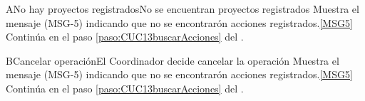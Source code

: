 	\begin{UCtrayectoriaA}{A}{No hay proyectos registrados}{No se encuentran proyectos registrados}
			\UCpaso[\UCactor] Muestra el mensaje (MSG-5) indicando que no se encontrarón acciones registrados.\ref{MSG5}
			\UCpaso Continúa en el paso \ref{paso:CUC13buscarAcciones} del .
	\end{UCtrayectoriaA}

	\begin{UCtrayectoriaA}{B}{Cancelar operación}{El Coordinador decide cancelar la operación}
			\UCpaso[\UCactor] Muestra el mensaje (MSG-5) indicando que no se encontrarón acciones registrados.\ref{MSG5}
			\UCpaso Continúa en el paso \ref{paso:CUC13buscarAcciones} del .
	\end{UCtrayectoriaA}
